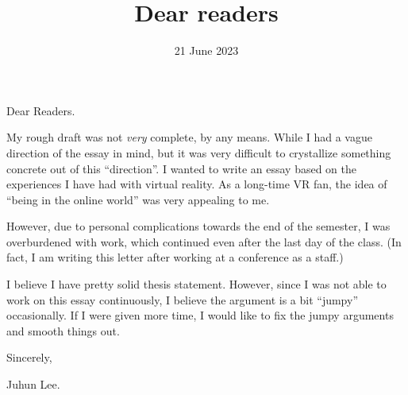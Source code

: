 \documentclass{mla}
\date{21 June 2023}
\title{Dear readers}
\begin{document}
\noindent
Dear Readers.

My rough draft was not \textit{very} complete, by any means.
While I had a vague direction of the essay in mind, but it was very difficult to crystallize something concrete out of this ``direction''.
I wanted to write an essay based on the experiences I have had with virtual reality.
As a long-time VR fan, the idea of ``being in the online world'' was very appealing to me.

However, due to personal complications towards the end of the semester, I was overburdened with work, which continued even after the last day of the class.
(In fact, I am writing this letter after working at a conference as a staff.)

I believe I have pretty solid thesis statement.
However, since I was not able to work on this essay continuously, I believe the argument is a bit ``jumpy'' occasionally.
If I were given more time, I would like to fix the jumpy arguments and smooth things out.

\noindent
Sincerely,

\noindent
Juhun Lee.
\end{document}
